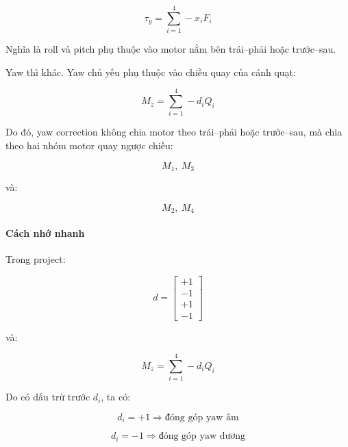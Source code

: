 \begin{equation}
    \tau_y = \sum_{i=1}^{4} -x_iF_i
\end{equation}

Nghĩa là roll và pitch phụ thuộc vào motor nằm bên trái--phải hoặc trước--sau.

Yaw thì khác. Yaw chủ yếu phụ thuộc vào chiều quay của cánh quạt:

\begin{equation}
    M_z = \sum_{i=1}^{4} -d_iQ_i
\end{equation}

Do đó, yaw correction không chia motor theo trái--phải hoặc trước--sau, mà chia
theo hai nhóm motor quay ngược chiều:

\begin{equation}
    M_1,\ M_3
\end{equation}

và:

\begin{equation}
    M_2,\ M_4
\end{equation}

\paragraph{Cách nhớ nhanh}

Trong project:

\begin{equation}
    d =
    \begin{bmatrix}
        +1\\
        -1\\
        +1\\
        -1
    \end{bmatrix}
\end{equation}

và:

\begin{equation}
    M_z = \sum_{i=1}^{4} -d_iQ_i
\end{equation}

Do có dấu trừ trước $d_i$, ta có:

\begin{equation}
    d_i = +1
    \Rightarrow
    \text{đóng góp yaw âm}
\end{equation}

\begin{equation}
    d_i = -1
    \Rightarrow
    \text{đóng góp yaw dương}
\end{equation}

